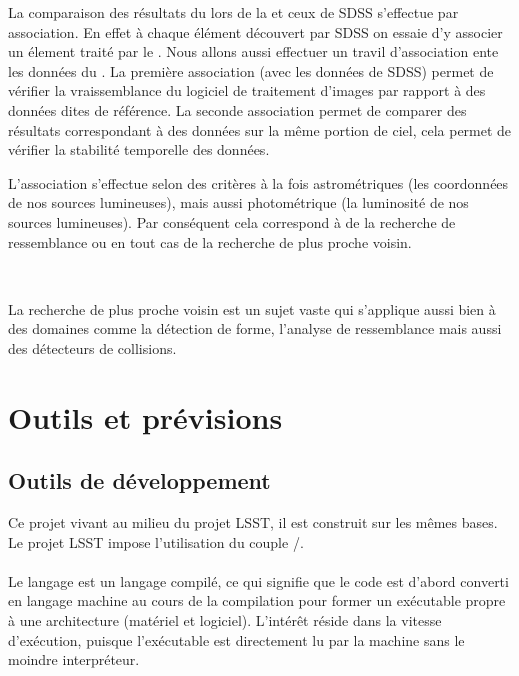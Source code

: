 La comparaison des résultats du \stack{} lors de la \DC{} et ceux de SDSS s'effectue par association. En effet à chaque élément découvert par SDSS on essaie d'y associer un élement traité par le \stack{}. Nous allons aussi effectuer un travil d'association ente les données du \stack{}. La première association (avec les données de SDSS) permet de vérifier la vraissemblance du logiciel de traitement d'images par rapport à des données dites de référence. La seconde association permet de comparer des résultats correspondant à des données sur la même portion de ciel, cela permet de vérifier la stabilité temporelle des données.

L'association s'effectue selon des critères à la fois astrométriques (les coordonnées de nos sources lumineuses), mais aussi photométrique (la luminosité de nos sources lumineuses). Par conséquent cela correspond à de la recherche de ressemblance ou en tout cas de la recherche de plus proche voisin.

\ 

La recherche de plus proche voisin est un sujet vaste qui s'applique aussi bien à des domaines comme la détection de forme, l'analyse de ressemblance mais aussi des détecteurs de collisions.

\section{Outils et prévisions}

	\subsection{Outils de développement}

Ce projet vivant au milieu du projet LSST, il est construit sur les mêmes bases. Le projet LSST impose l'utilisation du couple \Cpp{}/\Python{}.

			\paragraph{\Cpp}
Le langage \Cpp{} est un langage compilé, ce qui signifie que le code est d'abord converti en langage machine au cours de la compilation pour former un exécutable propre à une architecture (matériel et logiciel). L'intérêt réside dans la vitesse d'exécution, puisque l'exécutable est directement lu par la machine sans le moindre interpréteur.

